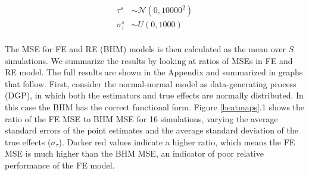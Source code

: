 \documentclass[12pt]{article}
\begin{document}


\begin{equation}
\begin{aligned}
\tau^s &\sim \mathcal{N}(0, 10000^2) \\
\sigma_{\tau}^s &\sim U(0,1000) \\
\end{aligned}
\end{equation}




The MSE for FE and RE (BHM) models is then calculated as the mean over $S$ simulations. We summarize the results by looking at ratios of MSEs in FE and RE model. The full results are shown in the Appendix and summarized in graphs that follow. First, consider the normal-normal model as data-generating process (DGP), in which both the estimators and true effects are normally distributed. In this case the BHM has the correct functional form. Figure \ref{heatmaps}.1 shows the ratio of the FE MSE to BHM MSE for 16 simulations, varying the average standard errors of the point estimates and the average standard deviation of the true effects ($\sigma_{\tau}$). Darker red values indicate a higher ratio, which means the FE MSE is much higher than the BHM MSE, an indicator of poor relative performance of the FE model.
\end{document}
